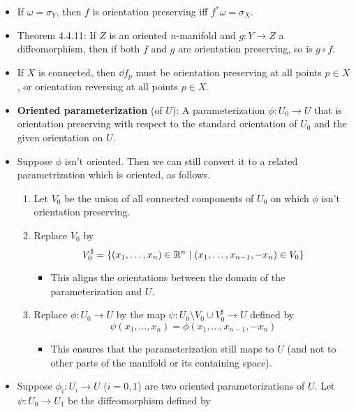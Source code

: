 \documentclass[../notes.tex]{subfiles}
\begin{document}
\begin{itemize}
    \item If $\omega=\sigma_Y$, then $f$ is orientation preserving iff $f^*\omega=\sigma_X$.
    \item Theorem 4.4.11: If $Z$ is an oriented $n$-manifold and $g:Y\to Z$ a diffeomorphism, then if both $f$ and $g$ are orientation preserving, so is $g\circ f$.
    \item If $X$ is connected, then $\dd{f}_p$ must be orientation preserving at all points $p\in X$, or orientation reversing at all points $p\in X$.
    \item \textbf{Oriented parameterization} (of $U$): A parameterization $\phi:U_0\to U$ that is orientation preserving with respect to the standard orientation of $U_0$ and the given orientation on $U$.
    \item Suppose $\phi$ isn't oriented. Then we can still convert it to a related parametrization which is oriented, as follows.
    \begin{enumerate}
        \item Let $V_0$ be the union of all connected components of $U_0$ on which $\phi$ isn't orientation preserving.
        \item Replace $V_0$ by
        \begin{equation*}
            V_0^\sharp = \{(x_1,\dots,x_n)\in\mathbb{R}^n\mid(x_1,\dots,x_{n-1},-x_n)\in V_0\}
        \end{equation*}
        \begin{itemize}
            \item This aligns the orientations between the domain of the parameterization and $U$.
        \end{itemize}
        \item Replace $\phi:U_0\to U$ by the map $\psi:U_0\setminus V_0\cup V_0^\sharp\to U$ defined by
        \begin{equation*}
            \psi(x_1,\dots,x_n) = \phi(x_1,\dots,x_{n-1},-x_n)
        \end{equation*}
        \begin{itemize}
            \item This ensures that the parameterization still maps to $U$ (and not to other parts of the manifold or its containing space).
        \end{itemize}
    \end{enumerate}
    \item Suppose $\phi_i:U_i\to U$ ($i=0,1$) are two oriented parameterizations of $U$. Let $\psi:U_0\to U_1$ be the diffeomorphism defined by

\end{itemize}
\end{document}
